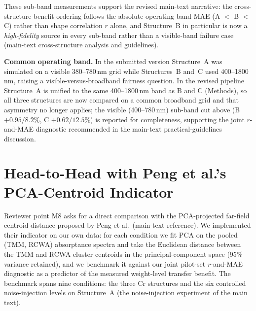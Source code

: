 \documentclass[11pt]{article}
\begin{document}
These sub-band measurements support the revised main-text narrative: the
cross-structure benefit ordering follows the absolute operating-band MAE
(A $<$ B $<$ C) rather than shape correlation $r$ alone, and Structure~B in
particular is now a \emph{high-fidelity} source in every sub-band rather than
a visible-band failure case (main-text cross-structure analysis and guidelines).

\textbf{Common operating band.} In the submitted version Structure~A was
simulated on a visible 380--780\,nm grid while Structures~B and~C used
400--1800\,nm, raising a visible-versus-broadband fairness question. In the
revised pipeline Structure~A is unified to the same 400--1800\,nm band as B
and C (Methods), so all three structures are now compared on a common
broadband grid and that asymmetry no longer applies; the visible
(400--780\,nm) sub-band cut above (B $+0.95/8.2\%$, C $+0.62/12.5\%$) is
reported for completeness, supporting the joint $r$-and-MAE diagnostic
recommended in the main-text practical-guidelines discussion.


\section{Head-to-Head with Peng et al.'s PCA-Centroid Indicator}
\label{sec:si_peng}

Reviewer point M8 asks for a direct comparison with the PCA-projected far-field
centroid distance proposed by Peng et al.\ (main-text reference). We
implemented their indicator on our own data: for each condition we fit PCA on the
pooled (TMM, RCWA) absorptance spectra and take the Euclidean distance between the
TMM and RCWA cluster centroids in the principal-component space (95\% variance
retained), and we benchmark it against our joint pilot-set $r$-and-MAE diagnostic
as a predictor of the measured weight-level transfer benefit. The benchmark spans
nine conditions: the three Cr structures and the six controlled noise-injection
levels on Structure~A (the noise-injection experiment of the main text).
\end{document}
